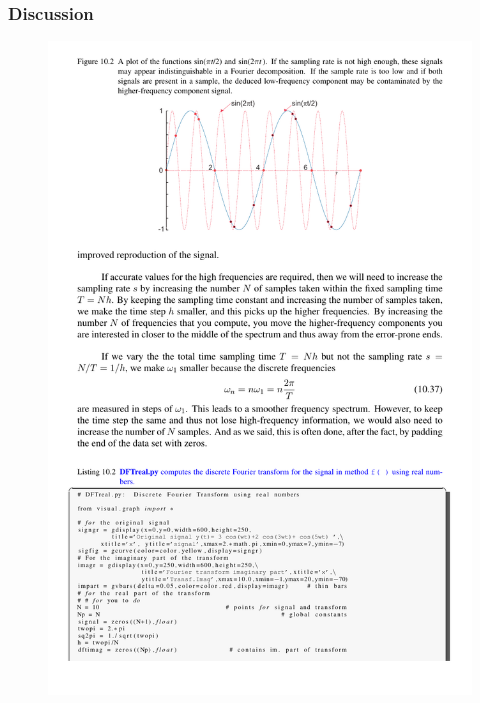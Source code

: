 \documentclass[hyperref={colorlinks=true}]{beamer}
\begin{document}
\begin{frame}%
  \frametitle{Discussion}

  \centering \Large {}
  
  \pause
  
  \begin{figure}
    \includegraphics[width=0.9\columnwidth]{Aliasing.pdf}
  \end{figure}
  
\end{frame}

\end{document}
